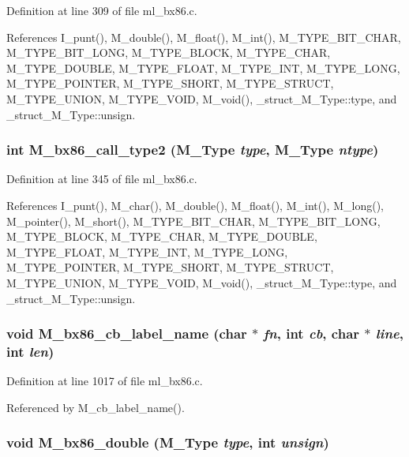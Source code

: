 Definition at line 309 of file ml\_\-bx86.c.

References I\_\-punt(), M\_\-double(), M\_\-float(), M\_\-int(), M\_\-TYPE\_\-BIT\_\-CHAR, M\_\-TYPE\_\-BIT\_\-LONG, M\_\-TYPE\_\-BLOCK, M\_\-TYPE\_\-CHAR, M\_\-TYPE\_\-DOUBLE, M\_\-TYPE\_\-FLOAT, M\_\-TYPE\_\-INT, M\_\-TYPE\_\-LONG, M\_\-TYPE\_\-POINTER, M\_\-TYPE\_\-SHORT, M\_\-TYPE\_\-STRUCT, M\_\-TYPE\_\-UNION, M\_\-TYPE\_\-VOID, M\_\-void(), \_\-struct\_\-M\_\-Type::type, and \_\-struct\_\-M\_\-Type::unsign.
\subsubsection{\setlength{\rightskip}{0pt plus 5cm}int M\_\-bx86\_\-call\_\-type2 (\bf{M\_\-Type} {\em type}, \bf{M\_\-Type} {\em ntype})}\label{ml__bx86_8c_f8ab8b2180cd5b4b19afd1b997ddf6d7}




Definition at line 345 of file ml\_\-bx86.c.

References I\_\-punt(), M\_\-char(), M\_\-double(), M\_\-float(), M\_\-int(), M\_\-long(), M\_\-pointer(), M\_\-short(), M\_\-TYPE\_\-BIT\_\-CHAR, M\_\-TYPE\_\-BIT\_\-LONG, M\_\-TYPE\_\-BLOCK, M\_\-TYPE\_\-CHAR, M\_\-TYPE\_\-DOUBLE, M\_\-TYPE\_\-FLOAT, M\_\-TYPE\_\-INT, M\_\-TYPE\_\-LONG, M\_\-TYPE\_\-POINTER, M\_\-TYPE\_\-SHORT, M\_\-TYPE\_\-STRUCT, M\_\-TYPE\_\-UNION, M\_\-TYPE\_\-VOID, M\_\-void(), \_\-struct\_\-M\_\-Type::type, and \_\-struct\_\-M\_\-Type::unsign.
\subsubsection{\setlength{\rightskip}{0pt plus 5cm}void M\_\-bx86\_\-cb\_\-label\_\-name (char $\ast$ {\em fn}, int {\em cb}, char $\ast$ {\em line}, int {\em len})}\label{ml__bx86_8c_ef7c5e1688e9b0fca9c6124593f7628d}




Definition at line 1017 of file ml\_\-bx86.c.

Referenced by M\_\-cb\_\-label\_\-name().
\subsubsection{\setlength{\rightskip}{0pt plus 5cm}void M\_\-bx86\_\-double (\bf{M\_\-Type} {\em type}, int {\em unsign})}\label{ml__bx86_8c_a72cd3e11d5646b837e6074c7af8dfba}




